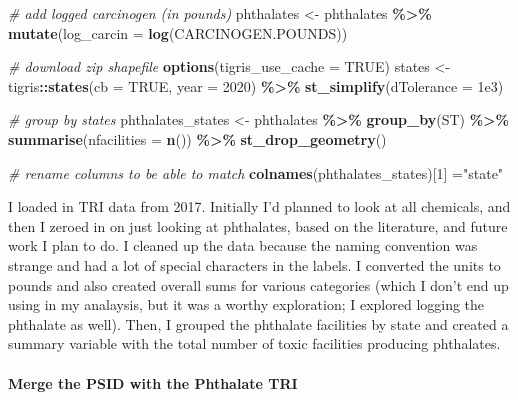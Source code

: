 \documentclass[
]{article}
\newenvironment{Shaded}{\begin{snugshade}}{\end{snugshade}}
\newcommand{\AttributeTok}[1]{\textcolor[rgb]{0.13,0.29,0.53}{#1}}
\newcommand{\CommentTok}[1]{\textcolor[rgb]{0.56,0.35,0.01}{\textit{#1}}}
\newcommand{\ConstantTok}[1]{\textcolor[rgb]{0.56,0.35,0.01}{#1}}
\newcommand{\DecValTok}[1]{\textcolor[rgb]{0.00,0.00,0.81}{#1}}
\newcommand{\FloatTok}[1]{\textcolor[rgb]{0.00,0.00,0.81}{#1}}
\newcommand{\FunctionTok}[1]{\textcolor[rgb]{0.13,0.29,0.53}{\textbf{#1}}}
\newcommand{\NormalTok}[1]{#1}
\newcommand{\OtherTok}[1]{\textcolor[rgb]{0.56,0.35,0.01}{#1}}
\newcommand{\SpecialCharTok}[1]{\textcolor[rgb]{0.81,0.36,0.00}{\textbf{#1}}}
\newcommand{\StringTok}[1]{\textcolor[rgb]{0.31,0.60,0.02}{#1}}
\begin{document}
\begin{Shaded}
\begin{Highlighting}[]
\CommentTok{\# add logged carcinogen (in pounds)}
\NormalTok{phthalates }\OtherTok{\textless{}{-}}\NormalTok{ phthalates }\SpecialCharTok{\%\textgreater{}\%}
  \FunctionTok{mutate}\NormalTok{(}\AttributeTok{log\_carcin =} \FunctionTok{log}\NormalTok{(CARCINOGEN.POUNDS))}

\CommentTok{\# download zip shapefile}
\FunctionTok{options}\NormalTok{(}\AttributeTok{tigris\_use\_cache =} \ConstantTok{TRUE}\NormalTok{)}
\NormalTok{states }\OtherTok{\textless{}{-}}\NormalTok{ tigris}\SpecialCharTok{::}\FunctionTok{states}\NormalTok{(}\AttributeTok{cb =} \ConstantTok{TRUE}\NormalTok{, }\AttributeTok{year =} \DecValTok{2020}\NormalTok{) }\SpecialCharTok{\%\textgreater{}\%} 
  \FunctionTok{st\_simplify}\NormalTok{(}\AttributeTok{dTolerance =} \FloatTok{1e3}\NormalTok{)}

\CommentTok{\# group by states}
\NormalTok{phthalates\_states }\OtherTok{\textless{}{-}}\NormalTok{ phthalates }\SpecialCharTok{\%\textgreater{}\%} \FunctionTok{group\_by}\NormalTok{(ST) }\SpecialCharTok{\%\textgreater{}\%} \FunctionTok{summarise}\NormalTok{(}\AttributeTok{nfacilities =} \FunctionTok{n}\NormalTok{()) }\SpecialCharTok{\%\textgreater{}\%} \FunctionTok{st\_drop\_geometry}\NormalTok{()}

\CommentTok{\# rename columns to be able to match}
\FunctionTok{colnames}\NormalTok{(phthalates\_states)[}\DecValTok{1}\NormalTok{] }\OtherTok{=}\StringTok{"state"}
\end{Highlighting}
\end{Shaded}

I loaded in TRI data from 2017. Initially I'd planned to look at all
chemicals, and then I zeroed in on just looking at phthalates, based on
the literature, and future work I plan to do. I cleaned up the data
because the naming convention was strange and had a lot of special
characters in the labels. I converted the units to pounds and also
created overall sums for various categories (which I don't end up using
in my analaysis, but it was a worthy exploration; I explored logging the
phthalate as well). Then, I grouped the phthalate facilities by state
and created a summary variable with the total number of toxic facilities
producing phthalates.

\hypertarget{merge-the-psid-with-the-phthalate-tri}{%
\paragraph{Merge the PSID with the Phthalate
TRI}\label{merge-the-psid-with-the-phthalate-tri}}
\end{document}
